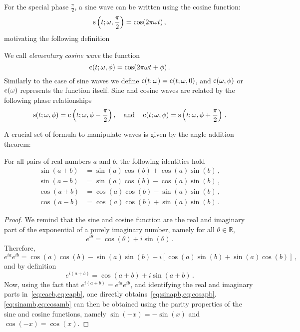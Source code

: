 For the special phase $\frac{\pi}{2}$, a sine wave can be written using the cosine
function:
\begin{equation}
  \operatorname{s}\left(t;\omega,\frac{\pi}{2}\right)= \cos(2\pi\omega t)\,,
\end{equation}
motivating the following definition
\begin{definition}
  \label{def:cosine-wave}
  We call \emph{elementary cosine wave} the function
  \begin{equation}
    \operatorname{c}(t;\omega,\phi)=\cos(2\pi\omega t + \phi)\,.\label{eq:cosine-wave}
  \end{equation}
  Similarly to the case of sine waves we define $\operatorname{c}(t;\omega)=\operatorname{c}(t;\omega,0)$, and
  $\operatorname{c}(\omega,\phi)$ or $\operatorname{c}(\omega)$ represents the function itself. Sine and cosine
  waves are related by the following phase relationships
  \begin{equation}
    \operatorname{s}(t;\omega,\phi)=\operatorname{c}\left(t;\omega,\phi-\frac{\pi}{2}\right),
    \quad\text{and}\quad
    \operatorname{c}(t;\omega,\phi)=\operatorname{s}\left(t;\omega,\phi+\frac{\pi}{2}\right)\,.
  \end{equation}
\end{definition}
A crucial set of formula to manipulate waves is given by the angle addition theorem:
\begin{theorem}
  \label{thm:angle-add}
  For all pairs of real numbers $a$ and $b$, the following identities hold
  \begin{align}
    \sin(a+b)&=\sin(a)\cos(b)+\cos(a)\sin(b)\,,\label{eq:sinapb}\\
    \sin(a-b)&=\sin(a)\cos(b)-\cos(a)\sin(b)\,,\label{eq:sinamb}\\
    \cos(a+b)&=\cos(a)\cos(b)-\sin(a)\sin(b)\,,\label{eq:cosapb}\\
    \cos(a-b)&=\cos(a)\cos(b)+\sin(a)\sin(b)\,.\label{eq:cosamb}
  \end{align}
\end{theorem}
\begin{proof}
  We remind that the sine and cosine function are the real and imaginary part of the
  exponential of a purely imaginary number, namely for all $\theta\in\mathbb{R}$,
  \begin{equation}
    e^{i\theta}=\cos(\theta)+i\sin(\theta)\,.
  \end{equation}
  Therefore,
  \begin{equation}
    e^{i a}e^{i b}=\cos(a)\cos(b)-\sin(a)\sin(b)+i[\cos(a)\sin(b)+\sin(a)\cos(b)]\,,
    \label{eq:eaeb}
  \end{equation}
  and by definition
  \begin{equation}
    e^{i(a+b)}=\cos(a+b)+i\sin(a+b)\,.\label{eq:eapb}
  \end{equation}
  Now, using the fact that $e^{i(a+b)}=e^{i a}e^{i b}$, and identifying the real and
  imaginary parts in~\cref{eq:eaeb,eq:eapb}, one directly
  obtains~\cref{eq:sinapb,eq:cosapb}. \cref{eq:sinamb,eq:cosamb} can then be obtained
  using the parity properties of the sine and cosine functions, namely $\sin(-x)=-\sin(x)$
  and $\cos(-x)=\cos(x)$.
\end{proof}
